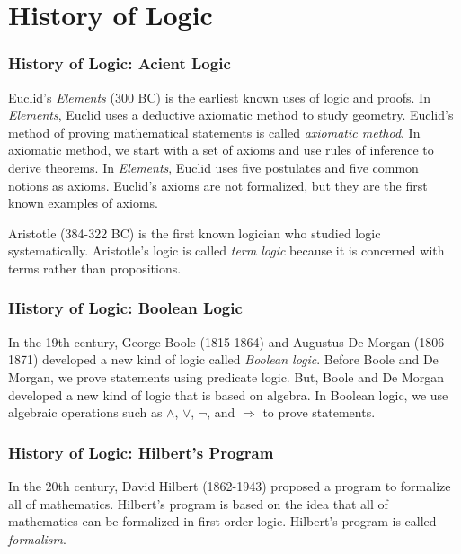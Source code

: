 \section{History of Logic}


\begin{frame}
    \frametitle{History of Logic: Acient Logic}

    Euclid's \textit{Elements} (300 BC) is the earliest known uses of logic and proofs.
    In \textit{Elements}, Euclid uses a deductive axiomatic method to study geometry.
    Euclid's method of proving mathematical statements is called \textit{axiomatic method}.
    In axiomatic method, we start with a set of axioms and use rules of inference to derive theorems.
    In \textit{Elements}, Euclid uses five postulates and five common notions as axioms.
    Euclid's axioms are not formalized, but they are the first known examples of axioms.

    Aristotle (384-322 BC) is the first known logician who studied logic systematically.
    Aristotle's logic is called \textit{term logic} because it is concerned with terms rather than propositions.

\end{frame}

\begin{frame}
    \frametitle{History of Logic: Boolean Logic}

    In the 19th century, George Boole (1815-1864) and Augustus De Morgan (1806-1871) developed a new kind of logic called \textit{Boolean logic}.
    Before Boole and De Morgan, we prove statements using predicate logic.
    But, Boole and De Morgan developed a new kind of logic that is based on algebra.
    In Boolean logic, we use algebraic operations such as $\land$, $\lor$, $\lnot$, and $\Rightarrow$ to prove statements.
    
\end{frame}

\begin{frame}
    \frametitle{History of Logic: Hilbert's Program}

    In the 20th century, David Hilbert (1862-1943) proposed a program to formalize all of mathematics.
    Hilbert's program is based on the idea that all of mathematics can be formalized in first-order logic.
    Hilbert's program is called \textit{formalism}.

\end{frame}